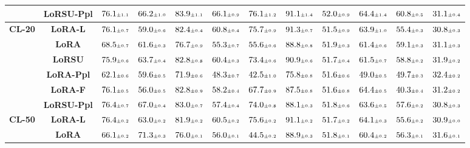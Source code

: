\begin{table}
\begin{center}
\begin{small}
\begin{tabular}{l c c c c c c c c c c c}
& \textbf{LoRSU-Ppl} & $76.1 \mtiny{\pm 1.1}$ & $66.2 \mtiny{\pm 1.0}$ & $83.9 \mtiny{\pm 1.1}$ & $66.1 \mtiny{\pm 0.9}$ & $76.1 \mtiny{\pm 1.2}$ & $91.1 \mtiny{\pm 1.4}$ & $52.0 \mtiny{\pm 0.9}$ & $64.4 \mtiny{\pm 1.4}$ & $60.8 \mtiny{\pm 0.5}$ & $31.1 \mtiny{\pm 0.4}$ \\
\midrule
\multirow{6}{*}{\textbf{CL-20}} & \textbf{LoRA-L} & $76.1 \mtiny{\pm 0.7}$ & $59.0 \mtiny{\pm 0.6}$ & $82.4 \mtiny{\pm 0.4}$ & $60.8 \mtiny{\pm 0.4}$ & $75.7 \mtiny{\pm 0.9}$ & $91.3 \mtiny{\pm 0.7}$ & $51.5 \mtiny{\pm 0.9}$ & $63.9 \mtiny{\pm 1.0}$ & $55.4 \mtiny{\pm 0.3}$ & $30.8 \mtiny{\pm 0.3}$ \\
& \textbf{LoRA} & $68.5 \mtiny{\pm 0.7}$ & $61.6 \mtiny{\pm 0.3}$ & $76.7 \mtiny{\pm 0.9}$ & $55.3 \mtiny{\pm 0.7}$ & $55.6 \mtiny{\pm 0.6}$ & $88.8 \mtiny{\pm 0.8}$ & $51.9 \mtiny{\pm 0.3}$ & $61.4 \mtiny{\pm 0.6}$ & $59.1 \mtiny{\pm 0.3}$ & $31.1 \mtiny{\pm 0.3}$ \\
& \textbf{LoRSU} & $75.9 \mtiny{\pm 0.6}$ & $63.7 \mtiny{\pm 0.4}$ & $82.8 \mtiny{\pm 0.8}$ & $60.4 \mtiny{\pm 0.3}$ & $73.4 \mtiny{\pm 0.6}$ & $90.9 \mtiny{\pm 0.6}$ & $51.7 \mtiny{\pm 0.4}$ & $61.5 \mtiny{\pm 0.7}$ & $58.8 \mtiny{\pm 0.2}$ & $31.9 \mtiny{\pm 0.2}$ \\
& \textbf{LoRA-Ppl} & $62.1 \mtiny{\pm 0.6}$ & $59.6 \mtiny{\pm 0.5}$ & $71.9 \mtiny{\pm 0.6}$ & $48.3 \mtiny{\pm 0.7}$ & $42.5 \mtiny{\pm 1.0}$ & $75.8 \mtiny{\pm 0.8}$ & $51.6 \mtiny{\pm 0.6}$ & $49.0 \mtiny{\pm 0.5}$ & $49.7 \mtiny{\pm 0.3}$ & $32.4 \mtiny{\pm 0.2}$ \\
& \textbf{LoRA-F} & $76.1 \mtiny{\pm 0.5}$ & $56.0 \mtiny{\pm 0.5}$ & $82.8 \mtiny{\pm 0.9}$ & $58.2 \mtiny{\pm 0.4}$ & $67.7 \mtiny{\pm 0.9}$ & $87.5 \mtiny{\pm 0.8}$ & $51.6 \mtiny{\pm 0.8}$ & $64.4 \mtiny{\pm 0.5}$ & $40.3 \mtiny{\pm 0.4}$ & $31.2 \mtiny{\pm 0.2}$ \\
& \textbf{LoRSU-Ppl} & $76.4 \mtiny{\pm 0.7}$ & $67.0 \mtiny{\pm 0.4}$ & $83.0 \mtiny{\pm 0.7}$ & $57.4 \mtiny{\pm 0.4}$ & $74.0 \mtiny{\pm 0.8}$ & $88.1 \mtiny{\pm 0.3}$ & $51.8 \mtiny{\pm 0.6}$ & $63.6 \mtiny{\pm 0.5}$ & $57.6 \mtiny{\pm 0.2}$ & $30.8 \mtiny{\pm 0.3}$ \\
\midrule
\multirow{6}{*}{\textbf{CL-50}} & \textbf{LoRA-L} & $76.4 \mtiny{\pm 0.2}$ & $63.0 \mtiny{\pm 0.2}$ & $81.9 \mtiny{\pm 0.2}$ & $60.5 \mtiny{\pm 0.2}$ & $75.6 \mtiny{\pm 0.2}$ & $91.1 \mtiny{\pm 0.2}$ & $51.7 \mtiny{\pm 0.2}$ & $64.1 \mtiny{\pm 0.3}$ & $55.6 \mtiny{\pm 0.2}$ & $30.9 \mtiny{\pm 0.0}$ \\
& \textbf{LoRA} & $66.1 \mtiny{\pm 0.2}$ & $71.3 \mtiny{\pm 0.3}$ & $76.0 \mtiny{\pm 0.1}$ & $56.0 \mtiny{\pm 0.1}$ & $44.5 \mtiny{\pm 0.2}$ & $88.9 \mtiny{\pm 0.3}$ & $51.8 \mtiny{\pm 0.1}$ & $60.4 \mtiny{\pm 0.2}$ & $56.3 \mtiny{\pm 0.1}$ & $31.6 \mtiny{\pm 0.1}$ \\

\end{tabular}
\end{small}
\end{center}
\end{table}
